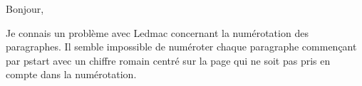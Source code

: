 \documentclass{article}
\begin{document}
\numberpstarttrue

\beginnumbering
\pstart Bonjour,

Je connais un problème avec Ledmac concernant la numérotation des paragraphes. Il semble impossible de numéroter chaque paragraphe commençant par pstart avec un chiffre romain centré sur la page qui ne soit pas pris en compte dans la numérotation.\pend
\endnumbering
\end{document}

